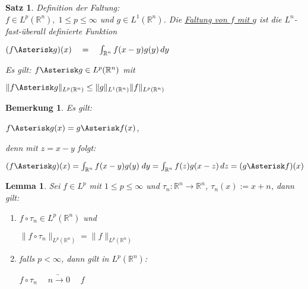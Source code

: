 \documentclass[11pt]{memoir}
\theoremstyle{changebreak}
\newtheorem{Bemerkung}{Bemerkung}[chapter]
\newtheorem{Lemma}{Lemma}[chapter]
\newtheorem{Satz}{Satz}[chapter]
\newcommand{\ffg}{f \Asterisk g}
\begin{document}
\begin{Satz}
\emph{Definition der Faltung}: \\
$f \in L^p(\mathbb R^n), \; 1 \leq p \leq \infty$ und $g \in L^1(\mathbb R^n)$.
Die \underline{Faltung von $f$ mit $g$} ist die $L^n$-fast-überall definierte Funktion
\begin{center}
	$(f \Asterisk g)(x) \quad = \quad \int_{\mathbb R^n} f(x-y)g(y) \,dy$
\end{center}
Es gilt: $f \Asterisk g \in L^p(\mathbb R^n)$ mit
\begin{center}
	$\| \ffg \|_{L^p(\mathbb R^n)} \leq \|g\|_{L^1(\mathbb R^n)} \|f \|_{L^p(\mathbb R^n)}$
\end{center}
\end{Satz}


\begin{Bemerkung}
Es gilt:
\begin{center}
	$\ffg(x) = g \Asterisk f(x)$,
\end{center}
denn mit $z = x -y$ folgt: 
\begin{center}
	$(\ffg)(x) = \int_{\mathbb R^n} f(x -y) g(y) \; dy = \int_{\mathbb R^n} f(z) g(x - z) \, dz = (g \Asterisk f)(x)$
\end{center}
\end{Bemerkung}


\begin{Lemma}
Sei $f \in L^p$ mit $1 \leq p \leq \infty$ und $\tau_n : \mathbb R^n \rightarrow \mathbb R^n$, $\tau_n(x) := x + n$, dann gilt:
\begin{enumerate} 
	\item $f \circ \tau_n \in L^p(\mathbb R^n)$ und 
	\begin{center}
		$\| f \circ \tau_n\|_{L^p(\mathbb R^n)} = \|f\|_{L^p(\mathbb R^n)}$
	\end{center}
	\item falls $p < \infty$, dann gilt in $L^p(\mathbb R^n)$:
	\begin{center}
		$f \circ \tau_n \quad \underrightarrow{\;n \rightarrow 0\;} \quad f$  
	\end{center}
\end{enumerate}
\end{Lemma}
\end{document}
